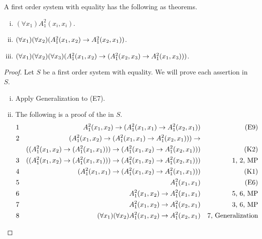 \begin{proposition}
  A first order system with equality has the following \wfs{} as theorems.
  \begin{enumerate}[(i)]
    \item \((\forall x_1)A^2_1(x_i, x_i)\).
    \item \((\forall x_1)(\forall x_2)(A^2_1(x_1, x_2) \rightarrow A^2_1(x_2, x_1))\).
    \item \((\forall x_1)(\forall x_2)(\forall x_3)(A^2_1(x_1, x_2) \rightarrow (A^2_1(x_2, x_3) \rightarrow A^2_1(x_1, x_3)))\).
  \end{enumerate}

  \begin{proof}
    Let \(S\) be a first order system with equality. We will prove each assertion in \(S\).
    \begin{enumerate}[(i)]
      \item Apply Generalization to (E7).
      \item The following is a proof of the \wf{} in \(S\).
        \begin{align*}
          \text{1}&&
          A^2_1(x_1, x_2) \rightarrow (A^2_1(x_1, x_1) \rightarrow A^2_1(x_2, x_1))&&
          \text{(E9)}\\
          \text{2}&&
          (A^2_1(x_1, x_2) \rightarrow (A^2_1(x_1, x_1) \rightarrow A^2_1(x_2, x_1))) \rightarrow&&
          \\
          &&
          ((A^2_1(x_1, x_2) \rightarrow (A^2_1(x_1, x_1))) \rightarrow (A^2_1(x_1, x_2) \rightarrow A^2_1(x_2, x_1)))&&
          \text{(K2)}\\
          \text{3}&&
          ((A^2_1(x_1, x_2) \rightarrow (A^2_1(x_1, x_1))) \rightarrow (A^2_1(x_1, x_2) \rightarrow A^2_1(x_2, x_1)))&&
          \text{1, 2, MP}\\
          \text{4}&&
          (A^2_1(x_1, x_1) \rightarrow (A^2_1(x_1, x_2) \rightarrow A^2_1(x_1, x_1)))&&
          \text{(K1)}\\
          \text{5}&&
          A^2_1(x_1, x_1)&&
          \text{(E6)}\\
          \text{6}&&
          A^2_1(x_1, x_2) \rightarrow A^2_1(x_1, x_1)&&
          \text{5, 6, MP}\\
          \text{7}&&
          A^2_1(x_1, x_2) \rightarrow A^2_1(x_2, x_1)&&
          \text{3, 6, MP}\\
          \text{8}&&
          (\forall x_1)(\forall x_2) A^2_1(x_1, x_2) \rightarrow A^2_1(x_2, x_1)&&
          \text{7, Generalization}
        \end{align*}


\end{enumerate}
\end{proof}
\end{proposition}
